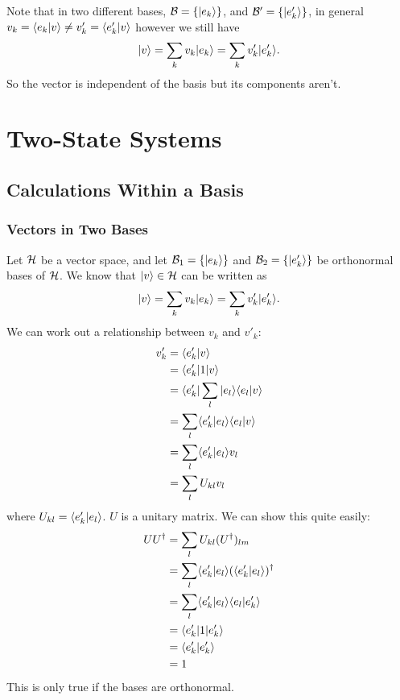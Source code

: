     Note that in two different bases, \(\mathcal{B} = \{\vert {e_k} \rangle\}\), and  \(\mathcal{B}' = \{\vert {e_k'} \rangle\}\), in general \(v_k = \langle {e_k} \vert {v} \rangle \ne v_k' = \langle {e_k'} \vert {v} \rangle\) however we still have
    \[\vert {v} \rangle = \sum_k v_k\vert {e_k} \rangle = \sum_k v_k'\vert {e_k'} \rangle.\]
    So the vector is independent of the basis but its components aren't.
    
    \section{Two-State Systems}
    \subsection{Calculations Within a Basis}
    \subsubsection{Vectors in Two Bases}
    Let \(\mathcal{H}\) be a vector space, and let \(\mathcal{B}_1 = \{\vert {e_k} \rangle\}\) and \(\mathcal{B}_2 = \{\vert {e'_k} \rangle\}\) be orthonormal bases of \(\mathcal{H}\).
    We know that \(\vert {v} \rangle\in\mathcal{H}\) can be written as
    \[\vert {v} \rangle = \sum_kv_k\vert {e_k} \rangle = \sum_kv'_k\vert {e'_k} \rangle.\]
    We can work out a relationship between \(v_k\) and \(v'_k\):
    \begin{align*}
        v'_k &= \langle {e'_k} \vert {v} \rangle\\
        &= \langle {e'_k} \vert1\vert {v} \rangle\\
        &= \langle {e'_k} \vert\sum_l\vert {e_l} \rangle\langle {e_l} \vert {v} \rangle\\
        &= \sum_l \langle {e'_k} \vert {e_l} \rangle\langle {e_l} \vert {v} \rangle\\
        &= \sum_l \langle {e'_k} \vert {e_l} \rangle v_l\\
        &= \sum_l U_{kl}v_l
    \end{align*}
    where \(U_{kl} = \langle {e'_k} \vert {e_l} \rangle\).
    \(U\) is a unitary matrix.
    We can show this quite easily:
    \begin{align*}
        UU^\dagger &= \sum_{l}U_{kl}(U^\dagger)_{lm}\\
        &= \sum_l \langle {e'_k} \vert {e_l} \rangle(\langle {e'_k} \vert {e_l} \rangle)^\dagger\\
        &= \sum_l\langle {e'_k} \vert {e_l} \rangle\langle {e_l} \vert {e'_k} \rangle\\
        &= \langle {e'_k} \vert1\vert {e'_k} \rangle\\
        &= \langle {e'_k} \vert {e'_k} \rangle\\
        &= 1
    \end{align*}
    This is only true if the bases are orthonormal.
    
